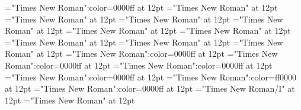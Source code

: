 \font\exampleusefirstoftypelastoftypesensearticlesectionletter="Times New Roman":color=0000ff at 12pt
\font\lastoftypevariantinflectionarticlesectionletter="Times New Roman" at 12pt
\font\variantinflectionarticlesectionletter="Times New Roman" at 12pt
\font\firstoftypevariantinflectionarticlesectionletter="Times New Roman" at 12pt
\font\firstoftypelastoftypestressfirstoftypelastoftypepronunciationarticlesectionletter="Times New Roman" at 12pt
\font\firstoftypelastoftypepronunciationarticlesectionletter="Times New Roman" at 12pt
\font\firstoftypeheadwordlastoftypearticlesectionletter="Times New Roman" at 12pt
\font\examplefirstoftypelastoftypesubentryarticlesectionletter="Times New Roman" at 12pt
\font\firstoftypeheadwordlastoftypefirstoftypelastoftypesubentryarticlesectionletter="Times New Roman" at 12pt
\font\firstoftypelastoftypesubentryarticlesectionletter="Times New Roman" at 12pt
\font\examplesensearticlesectionletter="Times New Roman":color=0000ff at 12pt
\font\firstoftypelastoftypewordusedefinitionfirstoftypelastoftypesensearticlesectionletter="Times New Roman":color=0000ff at 12pt
\font{}="Times New Roman":color=0000ff at 12pt
\font\firstoftypegrammarcategorylastoftypesensearticlesectionletter="Times New Roman":color=0000ff at 12pt
\font\sensebeforearticlesectionletter="Times New Roman":color=ff0000 at 12pt
\font\sensearticlesectionletter="Times New Roman":color=0000ff at 12pt
\font\articlesectionletter="Times New Roman/I" at 12pt
\font\sectionletter="Times New Roman" at 12pt
